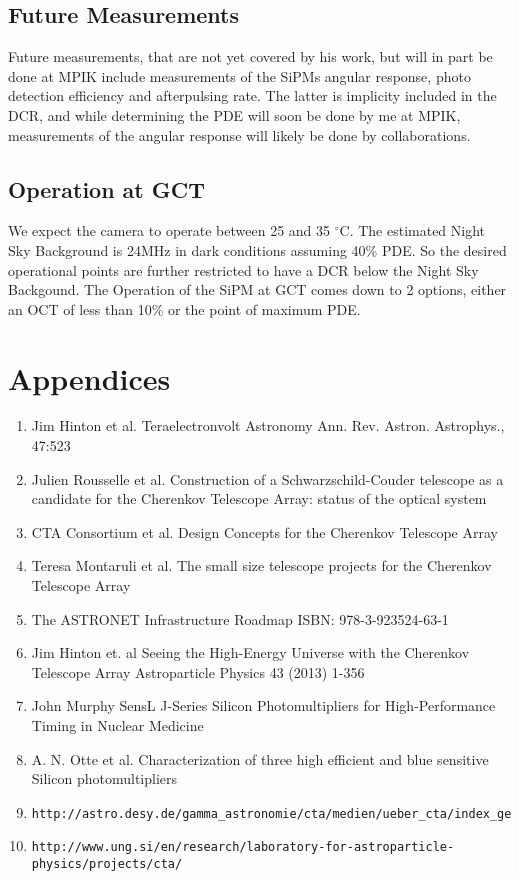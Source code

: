 \documentclass[article,type=pp,colorback,accentcolor=tud9c]{tudthesis}
\begin{document}
\section{Future Measurements}

Future measurements, that are not yet covered by his work, but will in part be done at MPIK include measurements of the SiPMs angular response, photo detection efficiency and afterpulsing rate. The latter is implicity included in the DCR, and while determining the PDE will soon be done by me at MPIK, measurements of the angular response will likely be done by collaborations.

\section{Operation at GCT}
We expect the camera to operate between 25 and 35 $^\circ$C.
The estimated Night Sky Background is 24MHz in dark conditions assuming 40\% PDE. So the desired operational points are further restricted to have a DCR below the Night Sky Backgound. 
The Operation of the SiPM at GCT comes down to 2 options, either an OCT of less than 10\% or the point of maximum PDE.

\newpage
\chapter{Appendices}
\begin{enumerate}
\item Jim Hinton et al. Teraelectronvolt Astronomy Ann. Rev. Astron. Astrophys., 47:523
\item Julien Rousselle et al. Construction of a Schwarzschild-Couder telescope as a candidate for the Cherenkov Telescope Array: status of the optical system
\item CTA Consortium et al. Design Concepts for the Cherenkov Telescope Array
\item Teresa Montaruli et al. The small size telescope projects for the Cherenkov Telescope Array
\item The ASTRONET Infrastructure Roadmap ISBN: 978-3-923524-63-1
\item Jim Hinton et. al Seeing the High-Energy Universe with the Cherenkov Telescope Array Astroparticle Physics 43 (2013) 1-356 
\item John Murphy SensL J-Series Silicon Photomultipliers for High-Performance Timing in Nuclear Medicine 
\item A. N. Otte et al. Characterization of three high efficient and blue sensitive Silicon photomultipliers
\item \begin{verbatim}http://astro.desy.de/gamma_astronomie/cta/medien/ueber_cta/index_ger.html\end{verbatim}
\item \begin{verbatim}http://www.ung.si/en/research/laboratory-for-astroparticle-physics/projects/cta/\end{verbatim}
\end{enumerate}
\end{document}
